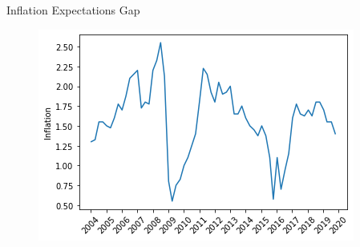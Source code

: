 \documentclass[aspectratio=169,xcolor=dvipsnames]{beamer}
\begin{document}

\begin{frame}{Inflation Expectations Gap}

  \begin{figure}[!ht]
    \centering
    \includegraphics{Reuter_Poll.png}
    \end{figure}

\end{frame}

\end{document}
